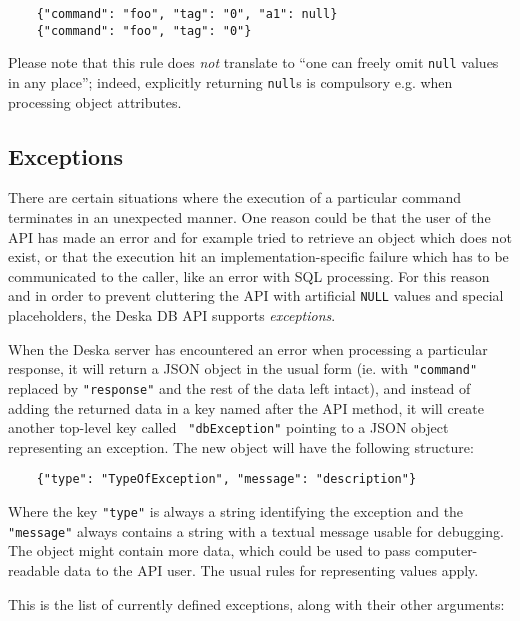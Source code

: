 \documentclass{article}
\begin{document}
\begin{lstlisting}
    {"command": "foo", "tag": "0", "a1": null}
    {"command": "foo", "tag": "0"}
\end{lstlisting}

Please note that this rule does {\em not} translate to ``one can freely omit {\tt null} values in any place''; indeed,
explicitly returning {\tt null}s is compulsory e.g. when processing object attributes.

\subsection{Exceptions}

There are certain situations where the execution of a particular command terminates in an unexpected manner.  One reason
could be that the user of the API has made an error and for example tried to retrieve an object which does not exist, or
that the execution hit an implementation-specific failure which has to be communicated to the caller, like an error with
SQL processing.  For this reason and in order to prevent cluttering the API with artificial {\tt NULL} values and
special placeholders, the Deska DB API supports {\em exceptions}.

When the Deska server has encountered an error when processing a particular response, it will return a JSON object in
the usual form (ie. with {\tt "command"} replaced by {\tt "response"} and the rest of the data left intact), and instead
of adding the returned data in a key named after the API method, it will create another top-level key called {\tt
"dbException"} pointing to a JSON object representing an exception.  The new object will have the following structure:

\begin{lstlisting}
    {"type": "TypeOfException", "message": "description"}
\end{lstlisting}

Where the key {\tt "type"} is always a string identifying the exception and the {\tt "message"} always contains a string
with a textual message usable for debugging.  The object might contain more data, which could be used to pass
computer-readable data to the API user.  The usual rules for representing values apply.

This is the list of currently defined exceptions, along with their other arguments:
\end{document}
